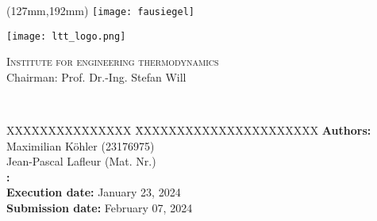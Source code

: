 \begin{titlepage}
	\thispagestyle{empty}

	\begin{textblock*}{\textwidth}(127mm,192mm)
	\texttt{[image: fausiegel]}
	\end{textblock*}

	\begin{minipage}[]{47mm}
		\texttt{[image: ltt\_logo.png]}
	\end{minipage}
	\begin{minipage}[]{.7\textwidth}
		\raggedleft
		\textsc{Institute for engineering thermodynamics}\\ %
		Chairman: Prof. Dr.-Ing. Stefan Will
	\end{minipage}
	
	\vspace{51mm}
	
	{\centering
	
	\large{\arbeit} \\	
	\Large{\textbf{\titel}}
	
	\par}
	
	\vspace{105mm}
	
	{\raggedright
	\begin{tabbing}
	XXXXXXXXXXXXXXX \= XXXXXXXXXXXXXXXXXXXXXX \kill
			\textbf{Authors:} 			\> Maximilian Köhler (23176975)		\\[6pt]
										\> Jean-Pascal Lafleur (Mat. Nr.)	\\[12pt]
			\textbf{\langdbbetreuer:}	\> \betreuer 						\\[12pt]
			\textbf{Execution date:}		\> January 23, 2024 \\[12pt]
			\textbf{Submission date:}	\> February 07, 2024														
	\end{tabbing}
	\par}
\end{titlepage}
